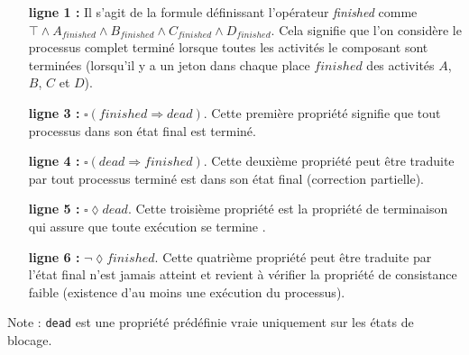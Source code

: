 \begin{itemize}

  \item[\textbf{ligne 1 :}] Il s'agit de la formule définissant l'opérateur
    \emph{finished} comme $\top \wedge A_{finished} \wedge B_{finished} \wedge
    C_{finished} \wedge D_{finished}$. Cela signifie que l'on considère le
    processus complet terminé lorsque toutes les activités le composant sont
    terminées (lorsqu'il y a un jeton dans chaque place $finished$ des
    activités $A$, $B$, $C$ et $D$).


  \item[\textbf{ligne 3 :} $\square (finished \Rightarrow dead)$.] Cette
    première propriété signifie que tout processus dans son état final est
    terminé. %


  \item[\textbf{ligne 4 :} $\square (dead \Rightarrow finished)$.] Cette
    deuxième propriété peut être traduite par \og tout processus terminé est
    dans son état final\fg{} (correction partielle). %


  \item[\textbf{ligne 5 :} $\square \lozenge dead$.] Cette troisième propriété
    est la propriété de terminaison qui assure que \og toute exécution se
    termine \fg{}. %


  \item[\textbf{ligne 6 :} $\neg \lozenge finished$.] Cette quatrième propriété
    peut être traduite par \og l'état final n'est jamais atteint \fg{} et
    revient à vérifier la propriété de consistance faible (existence d'au moins
    une exécution du processus).%

\end{itemize}

Note : \texttt{dead} est une propriété prédéfinie vraie uniquement sur les
états de blocage.

%

